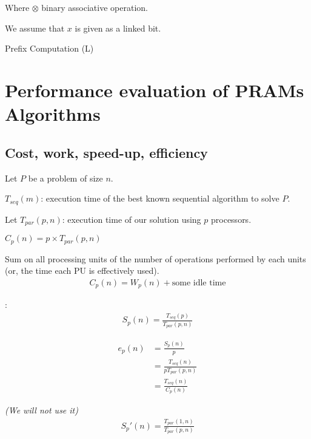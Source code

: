 Where $\otimes$ binary associative operation.

We assume that $x$ is given as a linked bit.

\begin{algorithm}[H]
\While{there exists a node i such that next[i]!=nil}{
	\For{all i in parallel}{
		\If{next[i]!=nil}{
			y[next[i]]$\leftarrow$ y[i] $\otimes$ y[next[i]]\\
			next[i] $\leftarrow$ next[next[i]]]\\
		}
	}
}
\caption{Prefix Computation (L)}
\end{algorithm}


\section{Performance evaluation of PRAMs Algorithms}
\subsection{Cost, work, speed-up, efficiency}
Let $P$ be a problem of size $n$.

$T_{seq}(m)$: execution time of the best known sequential algorithm to solve $P$.

Let $T_{par}(p,n)$: execution time of our solution using $p$ processors.

 $C_p(n)=p\times T_{par}(p,n)$

 Sum on all processing units 
of the number of operations performed by each units (or, the time each PU is effectively used).
\begin{align*}
C_p(n)=W_p(n)+\text{some idle time}
\end{align*}

:
\begin{align*}
S_p(n)=\frac{T_{seq}(p)}{T_{par}(p,n)}
\end{align*}

\begin{align*}
e_p(n) & =\frac{S_p(n)}{p}\\
& = \frac{T_{seq}(n)}{pT_{par}(p,n)}\\
& = \frac{T_{seq}(n)}{C_p(n)}
\end{align*}

 \textit{(We will not use it)}
\begin{align*}
S_p'(n)=\frac{T_{par}(1,n)}{T_{par}(p,n)}
\end{align*}

